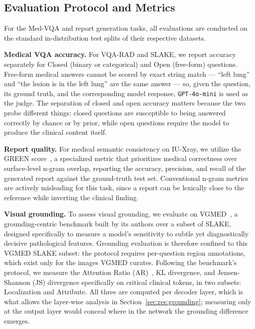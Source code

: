 \subsection{Evaluation Protocol and Metrics}
\label{sec:exp:metrics}

For the Med-VQA and report generation tasks, all evaluations are conducted on the standard in-distribution test splits of their respective datasets.

\textbf{Medical VQA accuracy.} For VQA-RAD and SLAKE, we report accuracy separately for Closed (binary or categorical) and Open (free-form) questions. Free-form medical answers cannot be scored by exact string match --- ``left lung'' and ``the lesion is in the left lung'' are the same answer --- so, given the question, its ground truth, and the corresponding model response, \texttt{GPT-4o-mini} is used as the judge. The separation of closed and open accuracy matters because the two probe different things: closed questions are susceptible to being answered correctly by chance or by prior, while open questions require the model to produce the clinical content itself.

\textbf{Report quality.} For medical semantic consistency on IU-Xray, we utilize the GREEN score~\cite{ostmeier2024green}, a specialized metric that prioritizes medical correctness over surface-level n-gram overlap, reporting the accuracy, precision, and recall of the generated report against the ground-truth test set. Conventional n-gram metrics are actively misleading for this task, since a report can be lexically close to the reference while inverting the clinical finding.

\textbf{Visual grounding.} To assess visual grounding, we evaluate on VGMED~\cite{liu2026vgmed}, a grounding-centric benchmark built by its authors over a subset of SLAKE, designed specifically to measure a model's sensitivity to subtle yet diagnostically decisive pathological features. Grounding evaluation is therefore confined to this VGMED SLAKE subset: the protocol requires per-question region annotations, which exist only for the images VGMED curates. Following the benchmark's protocol, we measure the Attention Ratio (AR)~\cite{khayatkhoei2025mllms}, KL divergence, and Jensen-Shannon (JS) divergence specifically on critical clinical tokens, in two subsets: Localization and Attribute. All three are computed per decoder layer, which is what allows the layer-wise analysis in Section~\ref{sec:res:grounding}; measuring only at the output layer would conceal where in the network the grounding difference emerges.

